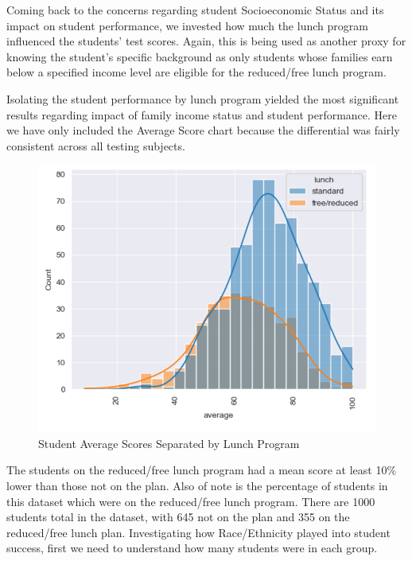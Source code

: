 \documentclass[doc]{apa6} %
\begin{document}
Coming back to the concerns regarding student Socioeconomic Status and its impact on student performance, we invested how much the lunch program influenced the students' test scores.  Again, this is being used as another proxy for knowing the student's specific background as only students whose families earn below a specified income level are eligible for the reduced/free lunch program.

Isolating the student performance by lunch program yielded the most significant results regarding impact of family income status and student performance. Here we have only included the Average Score chart because the differential was fairly consistent across all testing subjects.

\begin{figure}[H]
    \centering
    \includegraphics[width=0.75\linewidth]{StudentAvgScoresVSReducedLunch.png}
    \caption{Student Average Scores Separated by Lunch Program}
    \label{fig:lunch1}
\end{figure}
The students on the reduced/free lunch program had a mean score at least 10\% lower than those not on the plan. Also of note is the percentage of students in this dataset which were on the reduced/free lunch program. There are 1000 students total in the dataset, with 645 not on the plan and 355 on the reduced/free lunch plan. 
Investigating how Race/Ethnicity played into student success, first we need to understand how many students were in each group.
\end{document}
